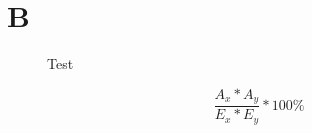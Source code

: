 
\section[A]{B}

    \begin{figure}[h]
        \centering
        \def\svgwidth{\linewidth}
        
        \vspace{0.5cm}
        \caption{Test}
        \label{vektorgrafik}
    \end{figure}
    
    \begin{equation}
        \frac{A_x*A_y}{E_x*E_y}*100\%
    \end{equation}